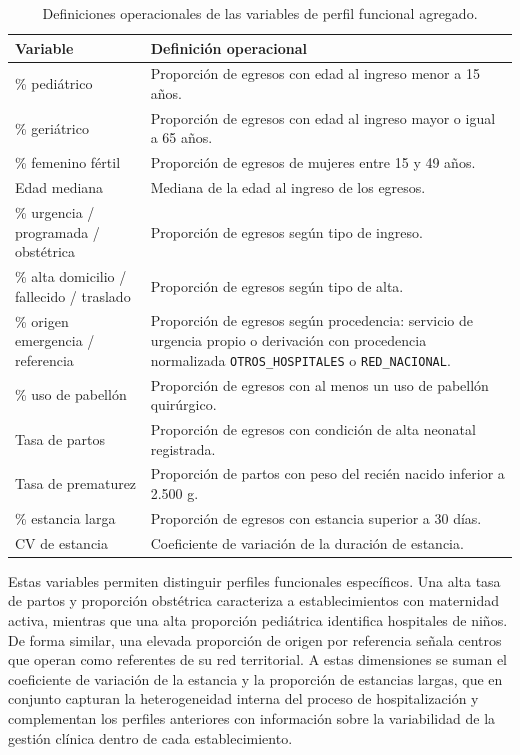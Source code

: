 \begin{table}[htbp]
\centering
\caption{Definiciones operacionales de las variables de perfil funcional
agregado.}
\label{tab:definiciones}
\begin{tabular}{p{5.2cm} p{7.0cm}}
\toprule
\textbf{Variable} & \textbf{Definición operacional} \\
\midrule
\% pediátrico & Proporción de egresos con edad al ingreso menor a 15 años. \\
\% geriátrico & Proporción de egresos con edad al ingreso mayor o igual a 65
años. \\
\% femenino fértil & Proporción de egresos de mujeres entre 15 y 49 años. \\
Edad mediana & Mediana de la edad al ingreso de los egresos. \\
\% urgencia / programada / obstétrica & Proporción de egresos según tipo de
ingreso. \\
\% alta domicilio / fallecido / traslado & Proporción de egresos según tipo de
alta. \\
\% origen emergencia / referencia & Proporción de egresos según procedencia:
servicio de urgencia propio o derivación con procedencia normalizada
\texttt{OTROS\_HOSPITALES} o \texttt{RED\_NACIONAL}. \\
\% uso de pabellón & Proporción de egresos con al menos un uso de pabellón
quirúrgico. \\
Tasa de partos & Proporción de egresos con condición de alta neonatal registrada.
\\
Tasa de prematurez & Proporción de partos con peso del recién nacido inferior a
2.500 g. \\
\% estancia larga & Proporción de egresos con estancia superior a 30 días. \\
CV de estancia & Coeficiente de variación de la duración de estancia. \\
\bottomrule
\end{tabular}
\end{table}

Estas variables permiten distinguir perfiles funcionales específicos. Una alta
tasa de partos y proporción obstétrica caracteriza a establecimientos con
maternidad activa, mientras que una alta proporción pediátrica identifica
hospitales de niños. De forma similar, una elevada proporción de origen por
referencia señala centros que operan como referentes de su red territorial. A
estas dimensiones se suman el coeficiente de variación de la estancia y la
proporción de estancias largas, que en conjunto capturan la heterogeneidad
interna del proceso de hospitalización y complementan los perfiles anteriores
con información sobre la variabilidad de la gestión clínica dentro de cada
establecimiento.


